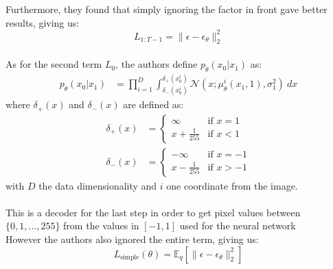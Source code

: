 \documentclass{article}
\begin{document}
Furthermore, they found that simply ignoring the factor in front gave better results, giving us:
\begin{equation}
  L_{1:T-1} = \| \epsilon - \epsilon_\theta \|_2^2
\end{equation}
\\
As for the second term $L_0$, the authors define $p_\theta(x_0 | x_1)$ as:
\begin{align}
  p_\theta(x_0 | x_1) &= \prod_{i=1}^{D} \int_{\delta_{-} (x_0^i)}^{\delta_{+} (x_0^i)} \mathcal{N}(x; \mu_\theta^i (x_1, 1), \sigma^2_1) \: dx
\end{align}
\hspace{0.5cm} where $\delta_{+} (x)$ and $\delta_{-} (x)$ are defined as:
\begin{align}
  \delta_{+} (x) &= \begin{cases}
    \infty & \text{if } x = 1 \\
    x + \frac{1}{255} & \text{if } x < 1 
  \end{cases}\\
  \delta_{-} (x) &= \begin{cases}
    - \infty & \text{if } x = - 1 \\
    x - \frac{1}{255} & \text{if } x > -1 
  \end{cases}
\end{align}
\hspace{0.5cm} with $D$ the data dimensionality and $i$ one coordinate from the image.
\\\\
This is a decoder for the last step in order to get pixel values between $\{0, 1, ..., 255 \}$ from the values in $[-1, 1]$ used for the neural network \cite{ho2020denoising,nichol2021improved} \\
However the authors also ignored the entire term, giving us:
\begin{equation}
  L_{\text{simple}}(\theta) = \mathbb{E}_q \left[ \| \epsilon - \epsilon_\theta \|_2^2 \right]
\end{equation}
\\\\
\end{document}
